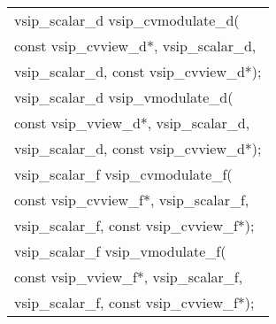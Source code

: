 \\\cvsiplh
\afh
\\\hspace*{.04\textwidth} {
\ttfamily
\begin{tabular}[H]{l}
vsip\_scalar\_d vsip\_cvmodulate\_d(\\*\hspace{.6cm}const vsip\_cvview\_d*, vsip\_scalar\_d, \\*\hspace{.6cm}vsip\_scalar\_d, const vsip\_cvview\_d*);\\
vsip\_scalar\_d vsip\_vmodulate\_d(\\*\hspace{.6cm}const vsip\_vview\_d*, vsip\_scalar\_d, \\*\hspace{.6cm}vsip\_scalar\_d, const vsip\_cvview\_d*);\\
vsip\_scalar\_f vsip\_cvmodulate\_f(\\*\hspace{.6cm}const vsip\_cvview\_f*, vsip\_scalar\_f, \\*\hspace{.6cm}vsip\_scalar\_f, const vsip\_cvview\_f*);\\
vsip\_scalar\_f vsip\_vmodulate\_f(\\*\hspace{.6cm}const vsip\_vview\_f*, vsip\_scalar\_f, \\*\hspace{.6cm}vsip\_scalar\_f, const vsip\_cvview\_f*);\\
\end{tabular}
}
\\\pyjvsiph
{}
